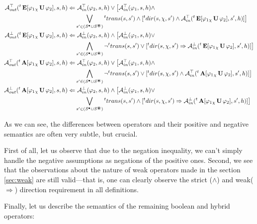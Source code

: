 {{\begin{align*}
	\assumeT_{out}(\withTime{t}\ctlE[ \varphi_1 \dctlUl{\chi} \varphi_2], s, h) \Leftarrow &\ \assumeT_{in}(\varphi_2, s, h) \lor \big[ \assumeT_{in}(\varphi_1, s, h) \land \\
	& \bigvee_{s' \in (\dtsSlocal \cup \dtsSborder)} \withTime{t}trans(s,s') \land [\withTime{t}dir(s, \chi, s') \land \assumeT_{in}(\withTime{t}\ctlE[ \varphi_1 \dctlUl{\chi} \varphi_2], s', h)] \big] \\
	\assumeF_{out}(\withTime{t}\ctlE[ \varphi_1 \dctlUl{\chi} \varphi_2], s, h) \Leftarrow &\ \assumeF_{in}(\varphi_2, s, h) \land \big[ \assumeF_{in}(\varphi_1, s, h) \lor \\
	& \bigwedge_{s' \in (\dtsSlocal \cup \dtsSborder)} \neg\withTime{t}trans(s,s') \lor [\withTime{t}dir(s, \chi, s') \Rightarrow \assumeF_{in}(\withTime{t}\ctlE[ \varphi_1 \dctlUl{\chi} \varphi_2], s', h)] \big] \\
	\assumeT_{out}(\withTime{t}\ctlA[ \varphi_1 \dctlUl{\chi} \varphi_2], s, h) \Leftarrow &\ \assumeT_{in}(\varphi_2, s, h) \lor \big[ \assumeT_{in}(\varphi_1, s, h) \land \\
	& \bigwedge_{s' \in (\dtsSlocal \cup \dtsSborder)} \neg\withTime{t}trans(s,s') \lor [\withTime{t}dir(s, \chi, s') \land \assumeT_{in}(\withTime{t}\ctlA[ \varphi_1 \dctlUl{\chi} \varphi_2], s', h)] \big] \\
	\assumeF_{out}(\withTime{t}\ctlA[ \varphi_1 \dctlUl{\chi} \varphi_2], s, h) \Leftarrow &\ \assumeF_{in}(\varphi_2, s, h) \land \big[ \assumeF_{in}(\varphi_1, s, h) \lor \\
	& \bigvee_{s' \in (\dtsSlocal \cup \dtsSborder)} \withTime{t}trans(s,s') \land [\withTime{t}dir(s, \chi, s') \Rightarrow \assumeF_{in}(\withTime{t}\ctlA[ \varphi_1 \dctlUl{\chi} \varphi_2], s', h)] \big] \\
	\end{align*}
}}

As we can see, the differences between operators and their positive and negative semantics are often very subtle, but crucial.

First of all, let us observe that due to the negation inequality, we can't simply handle the negative assumptions as negations of the positive ones. Second, we see that the observations about the nature of weak operators made in the section \ref{sec:weak} are still valid—that is, one can clearly observe the strict ($\land$) and weak($\Rightarrow$) direction requirement in all definitions.

Finally, let us describe the semantics of the remaining boolean and hybrid operators:

